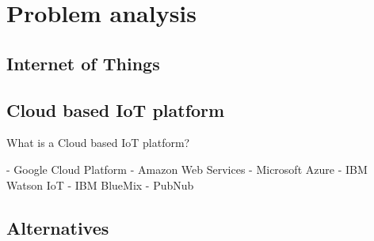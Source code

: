 \section{Problem analysis}
\subsection{Internet of Things}
\subsection{Cloud based IoT platform}
What is a Cloud based IoT platform? 

- Google Cloud Platform
- Amazon Web Services
- Microsoft Azure
- IBM Watson IoT
- IBM BlueMix
- PubNub

\subsection{Alternatives}